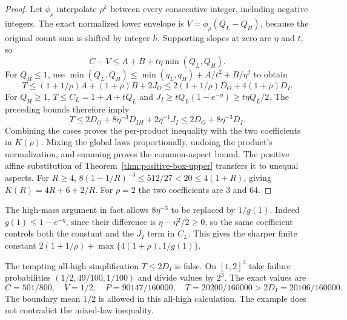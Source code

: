 \begin{proof}
Let $\phi_\rho$ interpolate $\rho^k$ between every consecutive integer,
including negative integers. The exact normalized lower envelope is
$V=\phi_\rho(Q_L-Q_H)$, because the original count sum is shifted by
integer $h$. Supporting slopes at zero are $\eta$ and $t$, so
\begin{equation}\label{eq:coarse-target}
 C-V\le A+B+t\eta\min(Q_L,Q_H).
\end{equation}
For $Q_H\le1$, use
$\min(Q_L,Q_H)\le\min(q_L,q_H)+A/t^2+B/\eta^2$ to obtain
\[
 T\le(1+1/\rho)A+(1+\rho)B+2J_O
 \le2(1+1/\rho)D_O+4(1+\rho)D_I.
\]
For $Q_H\ge1$, $T\le C_L=1+A+tQ_L$ and
$J_I\ge tQ_L(1-e^{-\eta})\ge t\eta Q_L/2$.
The preceding bounds therefore imply
\[
 T\le2D_O+8\eta^{-3}D_{IH}+2\eta^{-1}J_I
      \le2D_O+8\eta^{-3}D_I.
\]
Combining the cases proves the per-product inequality with the two
coefficients in $K(\rho)$. Mixing the global laws proportionally, undoing
the product's normalization, and summing proves the common-aspect bound.
The positive affine substitution of
Theorem~\ref{thm:positive-box-upper} transfers it to unequal aspects.
For $R\ge4$, $8(1-1/R)^{-3}\le512/27<20\le4(1+R)$, giving
$K(R)=4R+6+2/R$. For $\rho=2$ the two coefficients are $3$ and $64$.
\end{proof}
The high-mass argument in fact allows $8\eta^{-3}$ to be replaced by
$1/g(1)$. Indeed $g(1)\le1-e^{-\eta}$, since their difference is
$\eta-\eta^2/2\ge0$, so the same coefficient controls both the constant
and the $J_I$ term in $C_L$. This gives the sharper finite constant
$2(1+1/\rho)+\max\{4(1+\rho),1/g(1)\}$.

The tempting all-high simplification $T\le2D_I$ is false. On $[1,2]^3$
take failure probabilities $(1/2,49/100,1/100)$ and divide values by
$2^3$. The exact values are
\[
 C=501/800,\quad V=1/2,\quad P=90147/160000,
 \quad T=20200/160000>2D_I=20106/160000.
\]
The boundary mean $1/2$ is allowed in this all-high calculation. The
example does not contradict the mixed-law inequality.

